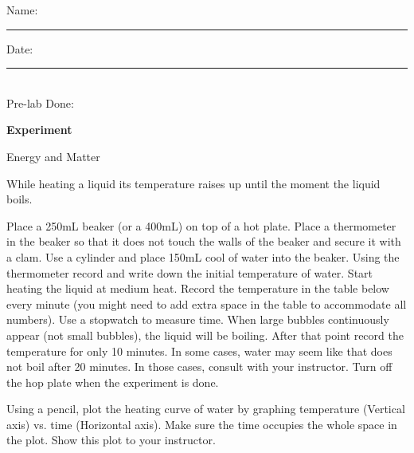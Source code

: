 \documentclass[main.tex]{subfiles}
\begin{document}
\begin{multicols}{2}
\begin{tcolorbox}[enhanced jigsaw,breakable,size=title,
colback=mybrown!05,colframe=black,fonttitle=\bfseries,
title=STUDENT INFO,pad at break=1mm, break at=15cm/0pt ]
\vspace{0.2cm}
\noindent Name: \rule{5cm}{0.4pt}Date:\rule{1cm}{0.4pt}\\
Pre-lab Done: \quad
\end{tcolorbox}
\end{multicols}
\hfill
\vspace{0.2cm}
\begin{center}
{\large \bfseries 
Experiment
\par
\Huge
Energy and Matter
\\[5pt] \par}
\vspace{0.2cm}
\end{center}
\par
\noindent
\uline{  \hfill \normalsize \hfill       }

\vspace{0.2cm}{\large \bfseries 1. Heating curve for water}
While heating a liquid its temperature raises up until the moment the liquid boils.
\begin{steps}
    \newstep[] Place a 250mL beaker (or a 400mL) on top of a hot plate. Place a thermometer in the beaker so that it does not touch the walls of the beaker and secure it with a clam.
    \newstep[] Use a cylinder and place 150mL cool of water into the beaker.
    \newstep[] Using the thermometer record and write down the initial temperature of water.
    \newstep[] Start heating the liquid at medium heat.
    \newstep[] Record the temperature in the table below every minute (you might need to add extra space in the table to accommodate all numbers). Use a stopwatch to measure time.
    \newstep[] When large bubbles continuously appear (not small bubbles), the liquid will be boiling. After that point record the temperature for only 10 minutes. In some cases, water may seem like that does not boil after 20 minutes. In those cases, consult with your instructor.
    \newstep[] Turn off the hop plate when the experiment is done.

\newstep[] Using a pencil, plot the heating curve of water by graphing temperature (Vertical axis) vs. time (Horizontal axis). Make sure the time occupies the whole space in the plot. Show this plot to your instructor.
\end{steps}
\end{document}
